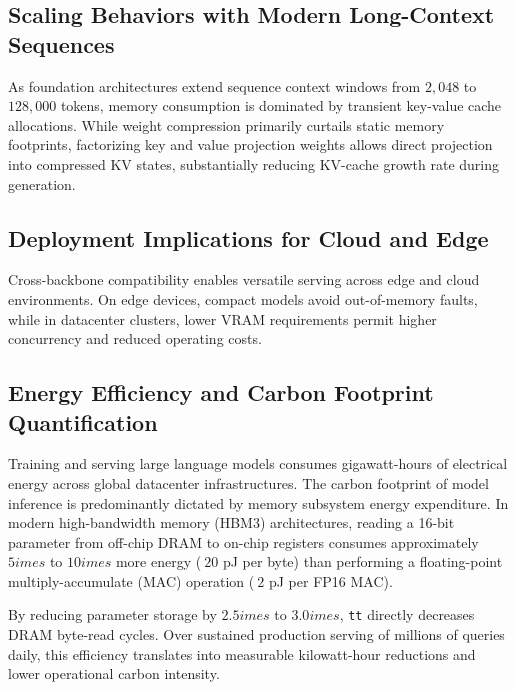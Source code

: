 \subsection{Scaling Behaviors with Modern Long-Context Sequences}
As foundation architectures extend sequence context windows from $2{,}048$ to $128{,}000$ tokens, memory consumption is dominated by transient key-value cache allocations. While weight compression primarily curtails static memory footprints, factorizing key and value projection weights allows direct projection into compressed KV states, substantially reducing KV-cache growth rate during generation.

\subsection{Deployment Implications for Cloud and Edge}
Cross-backbone compatibility enables versatile serving across edge and cloud environments. On edge devices, compact models avoid out-of-memory faults, while in datacenter clusters, lower VRAM requirements permit higher concurrency and reduced operating costs.

\subsection{Energy Efficiency and Carbon Footprint Quantification}
Training and serving large language models consumes gigawatt-hours of electrical energy across global datacenter infrastructures. The carbon footprint of model inference is predominantly dictated by memory subsystem energy expenditure. In modern high-bandwidth memory (HBM3) architectures, reading a 16-bit parameter from off-chip DRAM to on-chip registers consumes approximately $5	imes$ to $10	imes$ more energy ($~20$ pJ per byte) than performing a floating-point multiply-accumulate (MAC) operation ($~2$ pJ per FP16 MAC).

By reducing parameter storage by $2.5	imes$ to $3.0	imes$, \texttt{tt} directly decreases DRAM byte-read cycles. Over sustained production serving of millions of queries daily, this efficiency translates into measurable kilowatt-hour reductions and lower operational carbon intensity.
